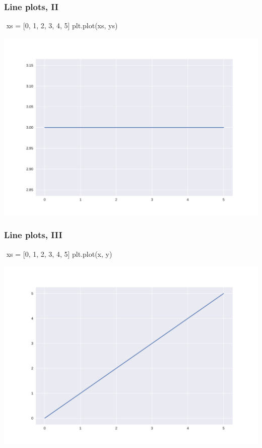 \documentclass[english,serif,mathserif,xcolor=pdftex,dvipsnames,table]{beamer}
\begin{document}
\begin{frame}[fragile]
  \frametitle{Line plots, II}
\begin{semiverbatim}\small
\In \,\,xs = [0, 1, 2, 3, 4, 5]
\In {}
\In plt.plot(xs, ys)
\end{semiverbatim}
  \begin{center}
    \includegraphics[height=0.66\textheight]{fig/lineplot0.pdf}
  \end{center}
\end{frame}


\begin{frame}[fragile]
  \frametitle{Line plots, III}
\begin{semiverbatim}\small
\In \,\,xs = [0, 1, 2, 3, 4, 5]
\In {}
\In plt.plot(x, y)
\end{semiverbatim}
  \begin{center}
    \includegraphics[height=0.66\textheight]{fig/lineplot1.pdf}
  \end{center}
\end{frame}
\end{document}
